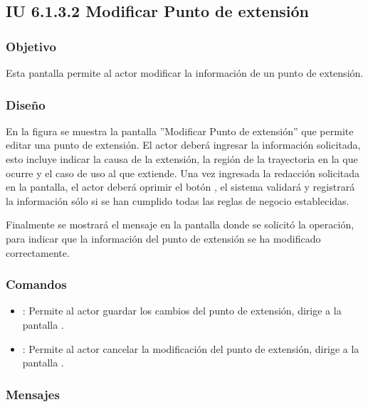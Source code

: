 \subsection{IU 6.1.3.2 Modificar Punto de extensión}

\subsubsection{Objetivo}
	Esta pantalla permite al actor modificar la información de un punto de extensión.
\subsubsection{Diseño}
	En la figura  se muestra la pantalla ''Modificar Punto de extensión'' que permite editar una punto de extensión. El actor deberá ingresar la información solicitada, esto incluye indicar la causa de la extensión, la región de la trayectoria en la que ocurre y el caso de uso al que extiende.
	Una vez ingresada la redacción solicitada en la pantalla, el actor deberá oprimir el botón , el sistema validará y registrará la información sólo si se han cumplido todas las reglas de negocio establecidas.
	
	Finalmente se mostrará el mensaje  en la pantalla donde se solicitó la operación, para indicar que la información del punto de extensión se ha modificado correctamente.

\subsubsection{Comandos}
\begin{itemize}
	\item {}: Permite al actor guardar los cambios del punto de extensión, dirige a la pantalla .
	\item {}: Permite al actor cancelar la modificación del punto de extensión, dirige a la pantalla .
\end{itemize}

\subsubsection{Mensajes}

